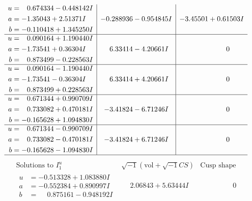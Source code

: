 \documentclass[1p]{elsarticle_modified}
\theoremstyle{definition}
\newcommand{\I}{\sqrt{-1}}
\begin{document}
$$\begin{array}{c|c|c}
\begin{aligned}
u &= \phantom{-}0.674334 - 0.448142 I \\
a &= -1.35043 + 2.51371 I \\
b &= -0.110418 + 1.345250 I\end{aligned}
 & -0.288936 - 0.954845 I & -3.45501 + 0.61503 I \\ \hline\begin{aligned}
u &= \phantom{-}0.090164 + 1.190440 I \\
a &= -1.73541 + 0.36304 I \\
b &= \phantom{-}0.873499 - 0.228563 I\end{aligned}
 & \phantom{-}6.33414 - 4.20661 I & \phantom{-0.000000 } 0 \\ \hline\begin{aligned}
u &= \phantom{-}0.090164 - 1.190440 I \\
a &= -1.73541 - 0.36304 I \\
b &= \phantom{-}0.873499 + 0.228563 I\end{aligned}
 & \phantom{-}6.33414 + 4.20661 I & \phantom{-0.000000 } 0 \\ \hline\begin{aligned}
u &= \phantom{-}0.671344 + 0.990709 I \\
a &= \phantom{-}0.733082 + 0.470181 I \\
b &= -0.165628 + 1.094830 I\end{aligned}
 & -3.41824 - 6.71246 I & \phantom{-0.000000 } 0 \\ \hline\begin{aligned}
u &= \phantom{-}0.671344 - 0.990709 I \\
a &= \phantom{-}0.733082 - 0.470181 I \\
b &= -0.165628 - 1.094830 I\end{aligned}
 & -3.41824 + 6.71246 I & \phantom{-0.000000 } 0\\
 \hline 
 \end{array}$$\newpage$$\begin{array}{c|c|c}  
\text{Solutions to }I^u_{1}& \I (\text{vol} + \sqrt{-1}CS) & \text{Cusp shape}\\
 \hline 
\begin{aligned}
u &= -0.513328 + 1.083880 I \\
a &= -0.552384 + 0.890997 I \\
b &= \phantom{-}0.875161 - 0.948192 I\end{aligned}
 & \phantom{-}2.06843 + 5.63444 I & \phantom{-0.000000 } 0 \\ \hline\begin{aligned}

\end{aligned}
\end{array}$$
\end{document}
